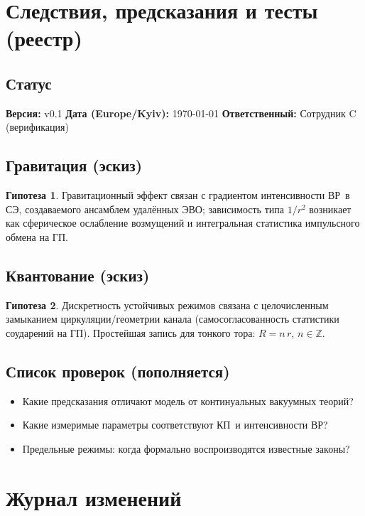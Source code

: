 \documentclass[12pt]{article}
\newcommand{\SE}{\mbox{\textsc{СЭ}}}
\newcommand{\EVO}{\mbox{\textsc{ЭВО}}}
\newcommand{\GP}{\mbox{\textsc{ГП}}}
\newcommand{\KP}{\mbox{\textsc{КП}}}
\newcommand{\VR}{\mbox{\textsc{ВР}}}
\theoremstyle{definition}
\newtheorem{hypothesis}{Гипотеза}[section]
\theoremstyle{plain}
\theoremstyle{remark}
\begin{document}
\section{Следствия, предсказания и тесты (реестр)}
\subsection*{Статус}
\textbf{Версия:} v0.1 \quad
\textbf{Дата (Europe/Kyiv):} \today \quad
\textbf{Ответственный:} Сотрудник C (верификация)

\subsection{Гравитация (эскиз)}
\begin{hypothesis}
Гравитационный эффект связан с градиентом интенсивности \VR\ в \SE, создаваемого ансамблем удалённых \EVO;
зависимость типа \(1/r^2\) возникает как сферическое ослабление возмущений и интегральная статистика импульсного обмена на \GP.
\end{hypothesis}

\subsection{Квантование (эскиз)}
\begin{hypothesis}
Дискретность устойчивых режимов связана с целочисленным замыканием циркуляции/геометрии канала
(самосогласованность статистики соударений на \GP). Простейшая запись для тонкого тора: \(R=n\,r\), \(n\in\mathbb{Z}\).
\end{hypothesis}

\subsection{Список проверок (пополняется)}
\begin{itemize}
\item Какие предсказания отличают модель от континуальных вакуумных теорий?
\item Какие измеримые параметры соответствуют \KP\ и интенсивности \VR?
\item Предельные режимы: когда формально воспроизводятся известные законы?
\end{itemize}



\appendix
\section{Журнал изменений}
\end{document}
